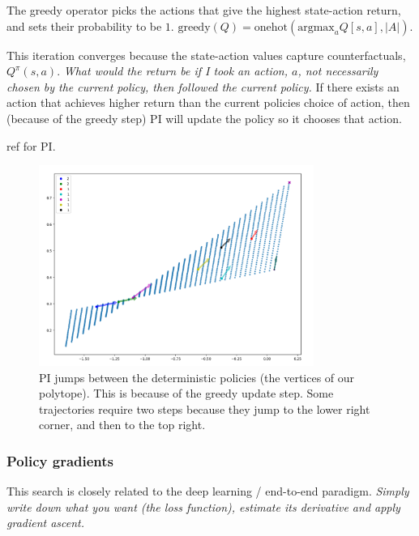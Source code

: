 The greedy operator picks the actions that give the highest state-action return,
and sets their probability to be $1$.
$\text{greedy}(Q) = \text{onehot}(\text{argmax}_a Q[s, a], |A|)$.

This iteration converges because the state-action values capture counterfactuals, $Q^{\pi}(s, a)$.
\textit{What would the return be if I took an action, $a$, not necessarily chosen by
the current policy, then followed the current policy.}
If there exists an action that achieves higher return than the current policies choice of action,
then (because of the greedy step) PI will update the policy so it chooses that action.

\footnotemark[7]


{\color{red}ref for PI.}

\begin{figure}[h!]
\centering
\includegraphics[width=0.8\textwidth,height=0.4\textheight]{../../pictures/figures/pi-polytope.png}
\caption{PI jumps between the deterministic policies (the vertices of our polytope).
This is because of the greedy update step. Some trajectories require two steps
because they jump to the lower right corner, and then to the top right.}
\end{figure}

\newpage

\subsubsection{Policy gradients}

This search is closely related to the deep learning / end-to-end paradigm.
\textit{Simply write down what you want (the loss function),
estimate its derivative and apply gradient ascent.}

